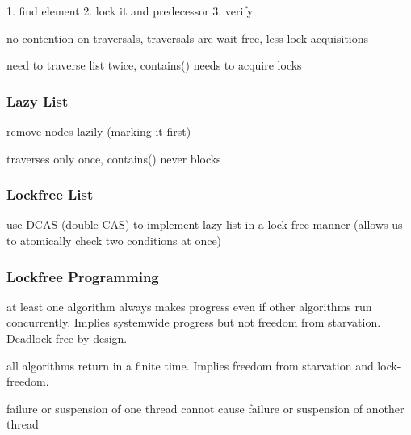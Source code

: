 \documentclass[11pt]{article}
\begin{document}
\begin{description}[noitemsep]
	\item[procedure] 1. find element 2. lock it and predecessor 3. verify
	\item[advantages] no contention on traversals, traversals are wait free, less lock acquisitions
	\item[disadvantages] need to traverse list twice, contains() needs to acquire locks
\end{description}

\subsubsection{Lazy List}

\begin{description}[noitemsep]
	\item[procedure] remove nodes lazily (marking it first)
	\item[advantages] traverses only once, contains() never blocks
\end{description}

\subsubsection{Lockfree List}

\begin{description}[noitemsep]
	\item[procedure] use DCAS (double CAS) to implement lazy list in a lock free manner (allows us to atomically check two conditions at once)
\end{description}

\subsubsection{Lockfree Programming}

\begin{description}[noitemsep]
	\item[lock-freedom] at least one algorithm always makes progress even if other algorithms run concurrently. Implies systemwide progress but not freedom from starvation. Deadlock-free by design.
	\item[wait-freedom] all algorithms return in a finite time. Implies freedom from starvation and lock-freedom.
	\item[non-blocking] failure or suspension of one thread cannot cause failure or suspension of another thread
\end{description}
\end{document}
